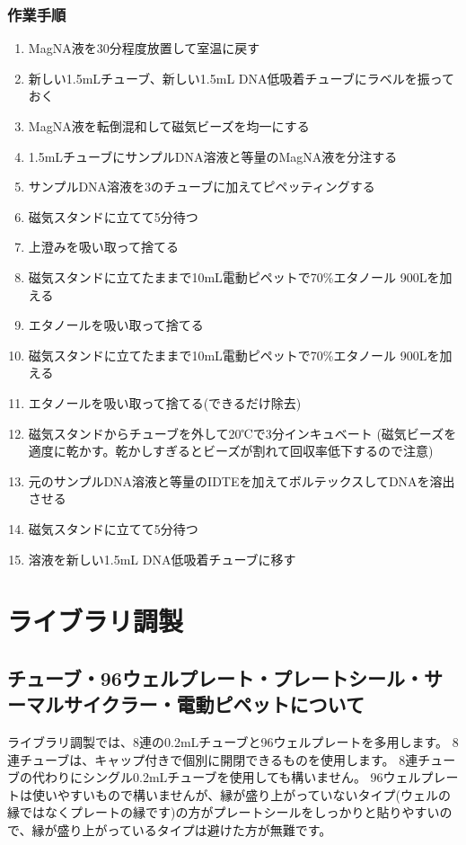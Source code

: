 \documentclass[titlepage,10pt,a4paper,uplatex]{jsbook}
\begin{document}
\subsubsection{作業手順}
\begin{enumerate}
\item MagNA液を30分程度放置して室温に戻す
\item 新しい1.5mLチューブ、新しい1.5mL DNA低吸着チューブにラベルを振っておく
\item MagNA液を転倒混和して磁気ビーズを均一にする
\item 1.5mLチューブにサンプルDNA溶液と等量のMagNA液を分注する
\item サンプルDNA溶液を3のチューブに加えてピペッティングする
\item 磁気スタンドに立てて5分待つ
\item 上澄みを吸い取って捨てる
\item 磁気スタンドに立てたままで10mL電動ピペットで70\%エタノール 900{\textmu}Lを加える
\item エタノールを吸い取って捨てる
\item 磁気スタンドに立てたままで10mL電動ピペットで70\%エタノール 900{\textmu}Lを加える
\item エタノールを吸い取って捨てる(できるだけ除去)
\item 磁気スタンドからチューブを外して20℃で3分インキュベート (磁気ビーズを適度に乾かす。乾かしすぎるとビーズが割れて回収率低下するので注意)
\item 元のサンプルDNA溶液と等量のIDTEを加えてボルテックスしてDNAを溶出させる
\item 磁気スタンドに立てて5分待つ
\item 溶液を新しい1.5mL DNA低吸着チューブに移す
\end{enumerate}

\section{ライブラリ調製}

\subsection{チューブ・96ウェルプレート・プレートシール・サーマルサイクラー・電動ピペットについて}

ライブラリ調製では、8連の0.2mLチューブと96ウェルプレートを多用します。
8連チューブは、キャップ付きで個別に開閉できるものを使用します。
8連チューブの代わりにシングル0.2mLチューブを使用しても構いません。
96ウェルプレートは使いやすいもので構いませんが、縁が盛り上がっていないタイプ(ウェルの縁ではなくプレートの縁です)の方がプレートシールをしっかりと貼りやすいので、縁が盛り上がっているタイプは避けた方が無難です。
\end{document}
